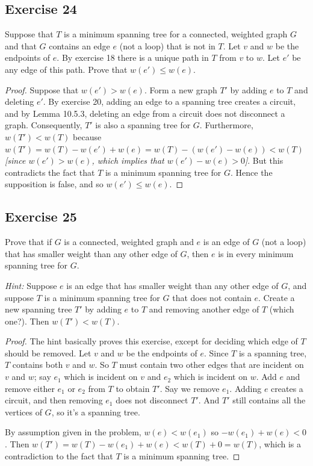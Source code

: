 \documentclass[14pt]{extarticle}
\begin{document}
\subsection{Exercise 24}
Suppose that \(T\) is a minimum spanning tree for a connected, weighted graph \(G\) and that \(G\) contains an edge \(e\)
(not a loop) that is not in \(T\). Let \(v\) and \(w\) be the endpoints of \(e\). By exercise 18 there is a unique path in
\(T\) from \(v\) to \(w\). Let \(e'\) be any edge of this path. Prove that \(w(e') \leq w(e)\).

\begin{proof}
    Suppose that \(w(e') > w(e)\). Form a new graph \(T'\) by adding \(e\) to \(T\) and deleting \(e'\). By exercise 20,
    adding an edge to a spanning tree creates a circuit, and by Lemma 10.5.3, deleting an edge from a circuit does not
    disconnect a graph. Consequently, \(T'\) is also a spanning tree for \(G\). Furthermore, \(w(T') < w(T)\) because \(w(T')
    = w(T) - w(e') + w(e) = w(T) - (w(e') - w(e)) < w(T)\) {\it [since \(w(e') > w(e)\), which implies that \(w(e') - w(e) >
                0\)]}. But this contradicts the fact that \(T\) is a minimum spanning tree for \(G\). Hence the supposition is false, and
    so \(w(e') \leq w(e)\).
\end{proof}

\subsection{Exercise 25}
Prove that if \(G\) is a connected, weighted graph and \(e\) is an edge of \(G\) (not a loop) that has smaller weight than
any other edge of \(G\), then \(e\) is in every minimum spanning tree for \(G\).

    {\it Hint:} Suppose \(e\) is an edge that has smaller weight than any other edge of \(G\), and suppose \(T\) is a minimum
spanning tree for \(G\) that does not contain \(e\). Create a new spanning tree \(T'\) by adding \(e\) to \(T\) and removing
another edge of \(T\) (which one?). Then \(w(T') < w(T)\).

\begin{proof}
    The hint basically proves this exercise, except for deciding which edge of \(T\) should be removed. Let \(v\) and \(w\) be
    the endpoints of \(e\). Since \(T\) is a spanning tree, \(T\) contains both \(v\) and \(w\). So \(T\) must contain two other
    edges that are incident on \(v\) and \(w\); say \(e_1\) which is incident on \(v\) and \(e_2\) which is incident on \(w\).
    Add \(e\) and remove either \(e_1\) or \(e_2\) from \(T\) to obtain \(T'\). Say we remove \(e_1\). Adding \(e\) creates a
    circuit, and then removing \(e_1\) does not disconnect \(T'\). And \(T'\) still contains all the vertices of \(G\), so it's a
    spanning tree.

    By assumption given in the problem, \(w(e) < w(e_1)\) so \(-w(e_1) + w(e) < 0\). Then \(w(T') = w(T) - w(e_1) + w(e) <
    w(T) + 0 = w(T)\), which is a contradiction to the fact that \(T\) is a minimum spanning tree.
\end{proof}
\end{document}

